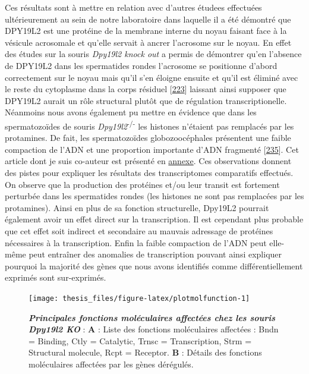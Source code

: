 \documentclass[12pt,a4paper,twoside]{ugathesis}
\theoremstyle{definition}
\theoremstyle{definition}
\theoremstyle{definition}
\theoremstyle{remark}
\begin{document}
Ces résultats sont à mettre en relation avec d'autres étudees effectuées
ultérieurement au sein de notre laboratoire dans laquelle il a été
démontré que DPY19L2 est une protéine de la membrane interne du noyau
faisant face à la vésicule acrosomale et qu'elle servait à ancrer
l'acrosome sur le noyau. En effet des études sur la souris \emph{Dpy19l2
knock out} a permis de démontrer qu'en l'absence de DPY19L2 dans les
spermatides rondes l'acrosome se positionne d'abord correctement sur le
noyau mais qu'il s'en éloigne ensuite et qu'il est éliminé avec le reste
du cytoplasme dans la corps résiduel
{[}\protect\hyperlink{ref-Pierre2012}{223}{]} laissant ainsi supposer
que DPY19L2 aurait un rôle structural plutôt que de régulation
transcriptionelle. Néanmoins nous avons également pu mettre en évidence
que dans les spermatozoïdes de souris
\emph{Dpy19l2}\textsuperscript{-/-} les histones n'étaient pas remplacés
par les protamines. De fait, les spermatozoïdes globozoocéphales
présentent une faible compaction de l'ADN et une proportion importante
d'ADN fragmenté {[}\protect\hyperlink{ref-Yassine2015a}{235}{]}. Cet
article dont je suis co-auteur est présenté en
\protect\hyperlink{dpy2015}{annexe}. Ces observations donnent des pistes
pour expliquer les résultats des transcriptomes comparatifs effectués.
On observe que la production des protéines et/ou leur transit est
fortement perturbée dans les spermatides rondes (les histones ne sont
pas remplacées par les protamines). Ainsi en plus de sa fonction
structurelle, Dpy19L2 pourrait également avoir un effet direct sur la
transcription. Il est cependant plus probable que cet effet soit
indirect et secondaire au mauvais adressage de protéines nécessaires à
la transcription. Enfin la faible compaction de l'ADN peut elle-même
peut entraîner des anomalies de transcription pouvant ainsi expliquer
pourquoi la majorité des gènes que nous avons identifiés comme
différentiellement exprimés sont sur-exprimés.

\newpage

\begin{figure}

{\centering \texttt{[image: thesis\_files/figure-latex/plotmolfunction-1]} 

}

\caption[Principales fonctions moléculaires affectées
chez les souris \emph{Dpy19l2} KO\\]{\textbf{\emph{Principales fonctions moléculaires
affectées chez les souris \emph{Dpy19l2} KO}} : \textbf{A} : Liste des
fonctions moléculaires affectées : Bndn = Binding, Ctly = Catalytic,
Trnsc = Transcription, Strm = Structural molecule, Rcpt = Receptor.
\textbf{B} : Détails des fonctions moléculaires affectées par les gènes
dérégulés.}\label{fig:plotmolfunction}
\end{figure}
\end{document}
